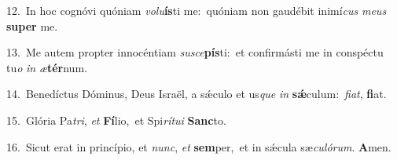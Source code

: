 {\numbfont\textcolor{\numbcolor}{12.}}~In hoc cognóvi quóniam \textit{vo}\-\textit{lu}\textbf{ís}ti me:~\star quóniam non gaudébit inimí\textit{cus} \textit{me}\-\textit{us} \textbf{su}\-\textbf{per} me.\par
{\numbfont\textcolor{\numbcolor}{13.}}~Me autem propter innocéntiam \textit{su}\-\textit{sce}\textbf{pís}ti:~\star et confirmásti me in conspéctu tu\textit{o} \textit{in} \textit{æ}\-\textbf{tér}num.\par
{\numbfont\textcolor{\numbcolor}{14.}}~Benedíctus Dóminus, Deus Israël, a sǽculo et us\textit{que} \textit{in} \textbf{sǽ}\-culum:~\star \textit{fi}\-\textit{at}, \textbf{fi}\-at.\par
{\numbfont\textcolor{\numbcolor}{15.}}~Glória Pa\-\textit{tri}\-, \textit{et} \textbf{Fí}\-lio,~\star et Spi\-\textit{rí}\-\textit{tu}\textit{i} \textbf{Sanc}\-to.\par
{\numbfont\textcolor{\numbcolor}{16.}}~Sicut erat in princípio, et \textit{nunc}\-, \textit{et} \textbf{sem}\-per,~\star et in sǽcula sæ\-\textit{cu}\-\textit{ló}\textit{rum}. \textbf{A}\-men.\par
